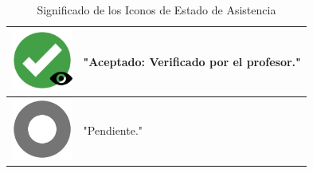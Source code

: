 \begin{table}[h!]
\begin{tabular}{|c|l|}
		\hline
		\includegraphics[width=2cm]{images/icono7.png} & "Aceptado: Verificado por el profesor." \\
		\hline
		\includegraphics[width=2cm]{images/icono8.png} & "Pendiente." \\
		\hline
	\end{tabular}
	\caption{Significado de los Iconos de Estado de Asistencia}
	\label{tab:iconosAsistencia}
\end{table}

\newpage
